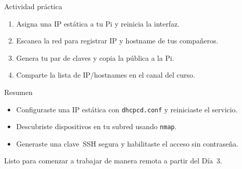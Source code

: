 \documentclass[aspectratio=169,professionalfonts]{beamer}
\begin{document}
\begin{frame}[fragile]{Actividad práctica}
  \begin{enumerate}
    \item Asigna una IP estática a tu Pi y reinicia la interfaz.
    \item Escanea la red para registrar IP y hostname de tus compañeros.
    \item Genera tu par de claves y copia la pública a la Pi.
    \item Comparte la lista de IP/hostnames en el canal del curso.
  \end{enumerate}
\end{frame}

\begin{frame}[fragile]{Resumen}
  \begin{itemize}
    \item Configuraste una IP estática con \texttt{dhcpcd.conf} y reiniciaste el servicio.
    \item Descubriste dispositivos en tu subred usando \texttt{nmap}.
    \item Generaste una clave SSH segura y habilitaste el acceso sin contraseña.
  \end{itemize}
  \vspace{0.5em}
  Listo para comenzar a trabajar de manera remota a partir del Día 3.
\end{frame}
\end{document}

